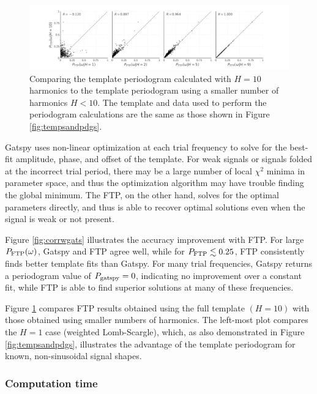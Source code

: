 \documentclass[apj]{emulateapj}
\begin{document}
\begin{figure}
    \centering
    \includegraphics[width=\textwidth]{plots/correlation_with_large_H.pdf}
    \caption{\label{fig:corrwhighh} Comparing the template periodogram calculated with $H=10$ harmonics
            to the template periodogram using a smaller number of harmonics $H < 10$. The template and
            data used to perform the periodogram calculations are the same as those shown in Figure \ref{fig:tempsandpdgs}.}    
\end{figure}

Gatspy uses non-linear optimization at each trial frequency to solve
for the best-fit amplitude, phase, and offset of the template. For
weak signals or signals folded at the incorrect trial period, there
may be a large number of local $\chi^2$ minima in parameter space, and thus
the optimization algorithm may have trouble finding the global minimum. The 
FTP, on the other hand, solves for the optimal parameters directly, and
thus is able to recover optimal solutions even when the signal is weak
or not present.

Figure \ref{fig:corrwgats} illustrates the accuracy improvement with FTP.
For large $P_{\rm FTP}(\omega)$, Gatspy and FTP agree well, while for
$P_{\rm FTP} \lesssim 0.25$, FTP consistently finds better template fits
than Gatspy. For many trial frequencies, Gatspy returns a periodogram value
of $P_{\rm gatspy} = 0$, indicating no improvement over a constant fit,
while FTP is able to find superior solutions at many of these frequencies.

Figure \ref{fig:corrwhighh} compares FTP results obtained using the full template
$(H=10)$ with those obtained using smaller numbers of harmonics. The left-most
plot compares the $H=1$ case (weighted Lomb-Scargle), which, as also demonstrated
in Figure \ref{fig:tempsandpdgs}, illustrates the advantage of the template
periodogram for known, non-sinusoidal signal shapes.


\subsubsection{Computation time}
\end{document}

